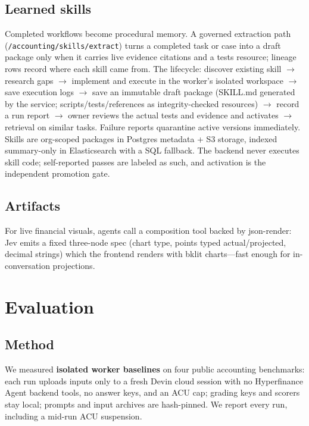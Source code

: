 \documentclass[11pt]{article}
\begin{document}
\subsection{Learned skills}

Completed workflows become procedural memory. A governed extraction path (\texttt{/accounting/skills/extract}) turns a completed task or case into a draft package only when it carries live evidence citations and a tests resource; lineage rows record where each skill came from. The lifecycle: discover existing skill $\rightarrow$ research gaps $\rightarrow$ implement and execute in the worker's isolated workspace $\rightarrow$ save execution logs $\rightarrow$ save an immutable draft package (SKILL.md generated by the service; scripts/tests/references as integrity-checked resources) $\rightarrow$ record a run report $\rightarrow$ owner reviews the actual tests and evidence and activates $\rightarrow$ retrieval on similar tasks. Failure reports quarantine active versions immediately. Skills are org-scoped packages in Postgres metadata + S3 storage, indexed summary-only in Elasticsearch with a SQL fallback. The backend never executes skill code; self-reported passes are labeled as such, and activation is the independent promotion gate.

\subsection{Artifacts}

For live financial visuals, agents call a composition tool backed by json-render: Jev emits a fixed three-node spec (chart type, points typed actual/projected, decimal strings) which the frontend renders with bklit charts---fast enough for in-conversation projections.

\section{Evaluation}

\subsection{Method}

We measured \textbf{isolated worker baselines} on four public accounting benchmarks: each run uploads inputs only to a fresh Devin cloud session with no Hyperfinance Agent backend tools, no answer keys, and an ACU cap; grading keys and scorers stay local; prompts and input archives are hash-pinned. We report every run, including a mid-run ACU suspension.
\end{document}
